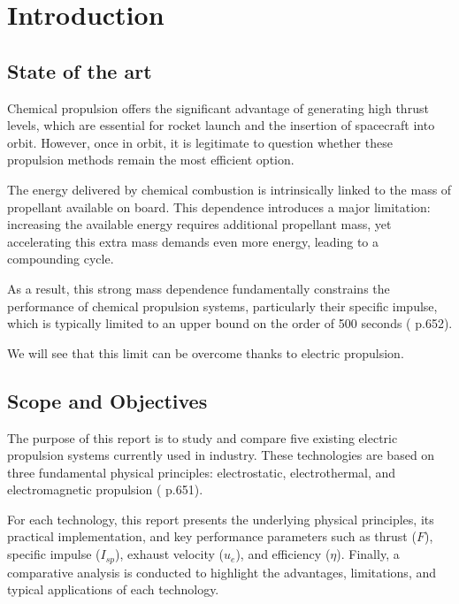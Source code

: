 \section{Introduction}

\subsection{State of the art}
    Chemical propulsion offers the significant advantage of generating high thrust levels, which are essential for rocket launch and the insertion of spacecraft into orbit. However, once in orbit, it is legitimate to question whether these propulsion methods remain the most efficient option.

The energy delivered by chemical combustion is intrinsically linked to the mass of propellant available on board. This dependence introduces a major limitation: increasing the available energy requires additional propellant mass, yet accelerating this extra mass demands even more energy, leading to a compounding cycle.

As a result, this strong mass dependence fundamentally constrains the performance of chemical propulsion systems, particularly their specific impulse, which is typically limited to an upper bound on the order of 500 seconds (\cite{mtp_book} p.652).

We will see that this limit can be overcome thanks to electric propulsion.

\subsection{Scope and Objectives}
The purpose of this report is to study and compare five existing electric propulsion systems currently used in industry. These technologies are based on three fundamental physical principles: electrostatic, electrothermal, and electromagnetic propulsion (\cite{mtp_book} p.651).

For each technology, this report presents the underlying physical principles, its practical implementation, and key performance parameters such as thrust ($F$), specific impulse ($I_{sp}$), exhaust velocity ($u_e$), and efficiency ($\eta$). Finally, a comparative analysis is conducted to highlight the advantages, limitations, and typical applications of each technology.